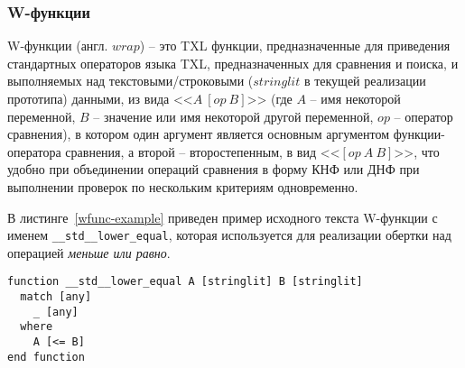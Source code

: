 \subsubsection{W-функции}

W-функции (англ. $wrap$) -- это TXL функции, предназначенные для приведения стандартных операторов языка TXL, предназначенных для сравнения и поиска, и выполняемых над текстовыми/строковыми ($stringlit$ в текущей реализации прототипа) данными, из вида <<$A~[op~B]$>> (где $A$ -- имя некоторой переменной, $B$ -- значение или имя некоторой другой переменной, $op$ -- оператор сравнения), в котором один аргумент является основным аргументом функции-оператора сравнения, а второй -- второстепенным, в вид <<$[op~A~B]$>>, что удобно при объединении операций сравнения в форму КНФ или ДНФ при выполнении проверок по нескольким критериям одновременно.

В листинге~\ref{wfunc-example} приведен пример исходного текста W-функции с именем \lstinline{__std__lower_equal}, которая используется для реализации обертки над операцией \textit{меньше или равно}.

\begin{lstlisting}[frame=single, language=TXL, label={wfunc-example}, caption={Пример синтезированной W-функции.}]
function __std__lower_equal A [stringlit] B [stringlit]
  match [any]
    _ [any]
  where
    A [<= B]
end function
\end{lstlisting}

